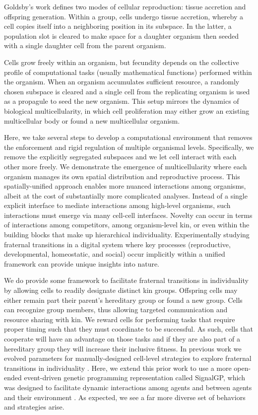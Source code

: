 Goldsby's work defines two modes of cellular reproduction: tissue accretion and offspring generation.
Within a group, cells undergo tissue accretion, whereby a cell copies itself into a neighboring position in its subspace.
In the latter, a population slot is cleared to make space for a daughter organism then seeded with a single daughter cell from the parent organism.

Cells grow freely within an organism, but fecundity depends on the collective profile of computational tasks (usually mathematical functions) performed within the organism.
When an organism accumulates sufficient resource, a randomly chosen subspace is cleared and a single cell from the replicating organism is used as a propagule to seed the new organism.
This setup mirrors the dynamics of biological multicellularity, in which cell proliferation may either grow an existing multicellular body or found a new multicellular organism.


Here, we take several steps to develop a computational environment that removes the enforcement and rigid regulation of multiple organismal levels.
Specifically, we remove the explicitly segregated subspaces and we let cell interact with each other more freely.
We demonstrate the emergence of multicellularity where each organism manages its own spatial distribution and reproductive process.
This spatially-unified approach enables more nuanced interactions among organisms, albeit at the cost of substantially more complicated analyses.
Instead of a single explicit interface to mediate interactions among high-level organisms, such interactions must emerge via many cell-cell interfaces.
Novelty can occur in terms of interactions among competitors, among organism-level kin, or even within the building blocks that make up hierarchical individuality.
Experimentally studying fraternal transitions in a digital system where key processes (reproductive, developmental, homeostatic, and social) occur implicitly within a unified framework can provide unique insights into nature.

We do provide some framework to facilitate fraternal transitions in individuality by allowing cells to readily designate distinct kin groups.
Offspring cells may either remain part their parent's hereditary group or found a new group.
Cells can recognize group members, thus allowing targeted communication and resource sharing with kin.
We reward cells for performing tasks that require proper timing such that they must coordinate to be successful.
As such, cells that cooperate will have an advantage on those tasks and if they are also part of a hereditary group they will increase their inclusive fitness.
In previous work we evolved parameters for manually-designed cell-level strategies to explore fraternal transitions in individuality \citep{moreno2019toward}.
Here, we extend this prior work to use a more open-ended event-driven genetic programming representation called SignalGP, which was designed to facilitate dynamic interactions among agents and between agents and their environment \citep{lalejini2018evolving}.  As expected, we see a far more diverse set of behaviors and strategies arise.
